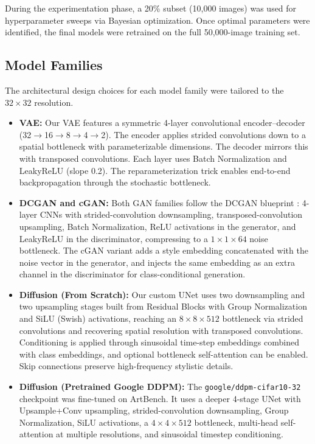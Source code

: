 \documentclass[runningheads]{llncs}
\begin{document}
During the experimentation phase, a 20\% subset (10,000 images) was used for hyperparameter sweeps via Bayesian optimization. Once optimal parameters were identified, the final models were retrained on the full 50,000-image training set.

\subsection{Model Families}

The architectural design choices for each model family were tailored to the $32 \times 32$ resolution.

\begin{itemize}
    \item \textbf{VAE:} Our VAE features a symmetric 4-layer convolutional encoder--decoder (32$\to$16$\to$8$\to$4$\to$2). The encoder applies strided convolutions down to a spatial bottleneck with parameterizable dimensions. The decoder mirrors this with transposed convolutions. Each layer uses Batch Normalization and LeakyReLU (slope 0.2). The reparameterization trick enables end-to-end backpropagation through the stochastic bottleneck.

    \item \textbf{DCGAN and cGAN:} Both GAN families follow the DCGAN blueprint \cite{dcgan}: 4-layer CNNs with strided-convolution downsampling, transposed-convolution upsampling, Batch Normalization, ReLU activations in the generator, and LeakyReLU in the discriminator, compressing to a $1{\times}1{\times}64$ noise bottleneck. The cGAN variant adds a style embedding concatenated with the noise vector in the generator, and injects the same embedding as an extra channel in the discriminator for class-conditional generation.

    \item \textbf{Diffusion (From Scratch):} Our custom UNet uses two downsampling and two upsampling stages built from Residual Blocks with Group Normalization and SiLU (Swish) activations, reaching an $8{\times}8{\times}512$ bottleneck via strided convolutions and recovering spatial resolution with transposed convolutions. Conditioning is applied through sinusoidal time-step embeddings combined with class embeddings, and optional bottleneck self-attention can be enabled. Skip connections preserve high-frequency stylistic details.

    \item \textbf{Diffusion (Pretrained Google DDPM):} The \texttt{google/ddpm-cifar10-32} checkpoint \cite{google_ddpm} was fine-tuned on ArtBench. It uses a deeper 4-stage UNet with Upsample+Conv upsampling, strided-convolution downsampling, Group Normalization, SiLU activations, a $4{\times}4{\times}512$ bottleneck, multi-head self-attention at multiple resolutions, and sinusoidal timestep conditioning.
\end{itemize}
\end{document}
